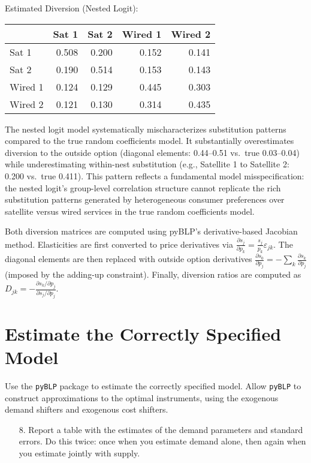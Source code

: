\documentclass[english,11pt]{article}
\begin{document}
\begin{enumerate}
Estimated Diversion (Nested Logit):
\begin{center}
\begin{tabular}{lrrrr}
\hline
 & Sat 1 & Sat 2 & Wired 1 & Wired 2 \\
\hline
Sat 1 & 0.508 & 0.200 & 0.152 & 0.141 \\
Sat 2 & 0.190 & 0.514 & 0.153 & 0.143 \\
Wired 1 & 0.124 & 0.129 & 0.445 & 0.303 \\
Wired 2 & 0.121 & 0.130 & 0.314 & 0.435 \\
\hline
\end{tabular}
\end{center}

The nested logit model systematically mischaracterizes substitution patterns compared to the true random coefficients model. It substantially overestimates diversion to the outside option (diagonal elements: 0.44--0.51 vs.\ true 0.03--0.04) while underestimating within-nest substitution (e.g., Satellite 1 to Satellite 2: 0.200 vs.\ true 0.411). This pattern reflects a fundamental model misspecification: the nested logit's group-level correlation structure cannot replicate the rich substitution patterns generated by heterogeneous consumer preferences over satellite versus wired services in the true random coefficients model.

Both diversion matrices are computed using pyBLP's derivative-based Jacobian method. Elasticities are first converted to price derivatives via $\frac{\partial s_j}{\partial p_k} = \frac{s_j}{p_k}\varepsilon_{jk}$. The diagonal elements are then replaced with outside option derivatives $\frac{\partial s_0}{\partial p_j} = -\sum_k \frac{\partial s_k}{\partial p_j}$ (imposed by the adding-up constraint). Finally, diversion ratios are computed as $D_{jk} = -\frac{\partial s_k/\partial p_j}{\partial s_j/\partial p_j}$.

\section{Estimate the Correctly Specified Model}

Use the \texttt{pyBLP} package to estimate the correctly specified model. Allow
\texttt{pyBLP} to construct approximations to the optimal instruments, using the
exogenous demand shifters and exogenous cost shifters.

\begin{enumerate}
\item[8.] Report a table with the estimates of the demand
parameters and standard errors. Do this twice: once when you estimate demand
alone, then again when you estimate jointly with supply.


\end{enumerate}
\end{enumerate}
\end{document}
